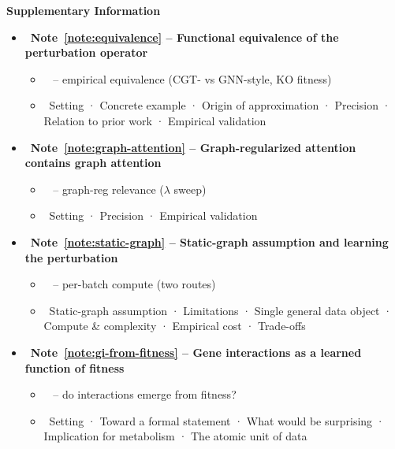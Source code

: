 \textbf{Supplementary Information}
\begin{itemize}\setlength{\itemsep}{1pt}\setlength{\topsep}{0.5pt}

  \item {}\ \textbf{Note~\ref{note:equivalence} -- Functional equivalence of the perturbation operator}
    \begin{itemize}\setlength{\itemsep}{0pt}
      \item {}\  -- empirical equivalence (CGT- vs GNN-style, KO fitness)
      \item {}\ Setting · Concrete example · Origin of approximation · Precision · Relation to prior work · Empirical validation
    \end{itemize}
  \item {}\ \textbf{Note~\ref{note:graph-attention} -- Graph-regularized attention contains graph attention}
    \begin{itemize}\setlength{\itemsep}{0pt}
      \item {}\  -- graph-reg relevance ($\lambda$ sweep)
      \item {}\ Setting · Precision · Empirical validation
    \end{itemize}
  \item {}\ \textbf{Note~\ref{note:static-graph} -- Static-graph assumption and learning the perturbation}
    \begin{itemize}\setlength{\itemsep}{0pt}
      \item {}\  -- per-batch compute (two routes)
      \item {}\ Static-graph assumption · Limitations · Single general data object · Compute \& complexity · Empirical cost · Trade-offs
    \end{itemize}
  \item {}\ \textbf{Note~\ref{note:gi-from-fitness} -- Gene interactions as a learned function of fitness}
    \begin{itemize}\setlength{\itemsep}{0pt}
      \item {}\  -- do interactions emerge from fitness?
      \item {}\ Setting · Toward a formal statement · What would be surprising · Implication for metabolism · The atomic unit of data

\end{itemize}
\end{itemize}
